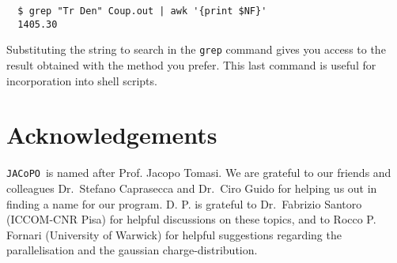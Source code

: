 \documentclass[a4paper]{article}
\newcommand{\jacopo}{\texttt{JACoPO}}
\begin{document}
\begin{verbatim}
  $ grep "Tr Den" Coup.out | awk '{print $NF}'
  1405.30
\end{verbatim}

Substituting the string to search in the \verb|grep| command gives you access to the result obtained with the method you prefer.
This last command is useful for incorporation into shell scripts.

\section*{Acknowledgements}
\jacopo\ is named after Prof. Jacopo Tomasi. We are grateful to our friends and colleagues Dr.~Stefano Caprasecca and Dr.~Ciro Guido for helping us out in finding a name for our program. D. P. is grateful to Dr.~Fabrizio Santoro (ICCOM-CNR Pisa) for helpful discussions on these topics, and to Rocco P. Fornari (University of Warwick) for helpful suggestions regarding the parallelisation and the gaussian charge-distribution.



\end{document}
